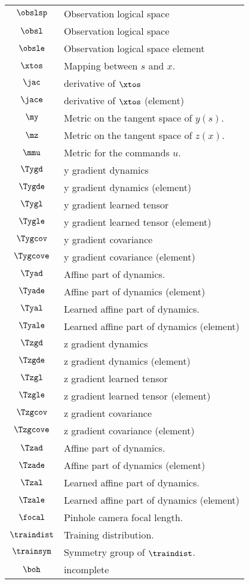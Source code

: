 \begin{longtable}{cl}
 $\obslsp$ &  Observation logical space\\ 
 $\obsl$ &  Observation logical space\\ 
 $\obsle$ &  Observation logical space element\\ 
 $\xtos$ &  Mapping between $s$ and $x$.\\ 
 $\jac$ &  derivative of $\xtos$\\ 
 $\jace$ &  derivative of $\xtos$ (element)\\ 
 $\my$ &  Metric on the tangent space of $y(s)$.\\ 
 $\mz$ &  Metric on the tangent space of $z(x)$.\\ 
 $\mmu$ &  Metric for the commands $u$. \\ 
 $\Tygd$ &  y gradient dynamics\\ 
 $\Tygde$ &  y gradient dynamics (element)\\ 
 $\Tygl$ &  y gradient learned tensor \\ 
 $\Tygle$ &  y gradient learned tensor (element)\\ 
 $\Tygcov$ &  y gradient covariance\\ 
 $\Tygcove$ &  y gradient covariance (element)\\ 
 $\Tyad$ &  Affine part of dynamics.\\ 
 $\Tyade$ &  Affine part of dynamics (element)\\ 
 $\Tyal$ &  Learned affine part of dynamics.\\ 
 $\Tyale$ &  Learned affine part of dynamics (element)\\ 
 $\Tzgd$ &  z gradient dynamics\\ 
 $\Tzgde$ &  z gradient dynamics (element)\\ 
 $\Tzgl$ &  z gradient learned tensor \\ 
 $\Tzgle$ &  z gradient learned tensor (element)\\ 
 $\Tzgcov$ &  z gradient covariance\\ 
 $\Tzgcove$ &  z gradient covariance (element)\\ 
 $\Tzad$ &  Affine part of dynamics.\\ 
 $\Tzade$ &  Affine part of dynamics (element)\\ 
 $\Tzal$ &  Learned affine part of dynamics.\\ 
 $\Tzale$ &  Learned affine part of dynamics (element)\\ 
 $\focal$ &  Pinhole camera focal length.\\ 
 $\traindist$ &  Training distribution.\\ 
 $\trainsym$ &  Symmetry group of $\traindist$.\\ 
 $\boh$ &  incomplete\\ 
 \end{longtable}
